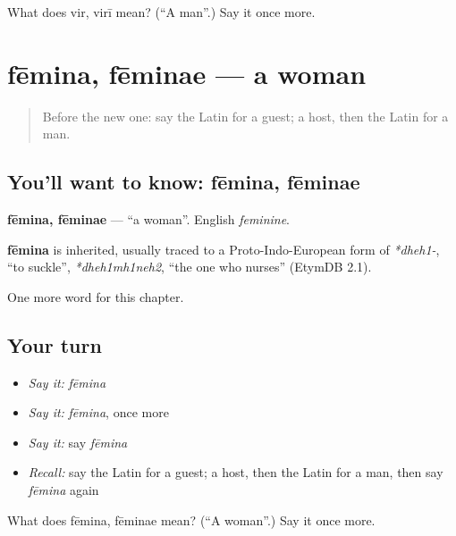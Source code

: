\begin{tcolorbox}[breakable,colback=teal!4,colframe=teal!35!black,title={Before you move on}]
What does vir, virī mean? (\textquotedblleft{}A man\textquotedblright{}.) Say it once more.
\end{tcolorbox}
\section[fēmina, fēminae]{fēmina, fēminae — a woman}

\label{lesson:LA-C72-femina}



\begin{quote}
Before the new one: say the Latin for a guest; a host, then the Latin for a man.
\end{quote}

\subsection*{You'll want to know: fēmina, fēminae}
\textbf{fēmina, fēminae} — \textquotedblleft{}a woman\textquotedblright{}. English \emph{feminine}.

\begin{cousinweb}
\textbf{fēmina} is inherited, usually traced to a Proto-Indo-European form of \emph{*dheh1-}, \textquotedblleft{}to suckle\textquotedblright{}, \emph{*dheh1mh1neh2}, \textquotedblleft{}the one who nurses\textquotedblright{} (EtymDB 2.1).
\end{cousinweb}

\begin{grammarlens}[title={What you've built}]
One more word for this chapter.
\end{grammarlens}

\subsection*{Your turn}
\begin{itemize}
\raggedright
  \item \emph{Say it:} \emph{fēmina}
  \item \emph{Say it:} \emph{fēmina}, once more
  \item \emph{Say it:} say \emph{fēmina}
  \item \emph{Recall:} say the Latin for a guest; a host, then the Latin for a man, then say \emph{fēmina} again
\end{itemize}

\begin{tcolorbox}[breakable,colback=teal!4,colframe=teal!35!black,title={Before you move on}]
What does fēmina, fēminae mean? (\textquotedblleft{}A woman\textquotedblright{}.) Say it once more.
\end{tcolorbox}
